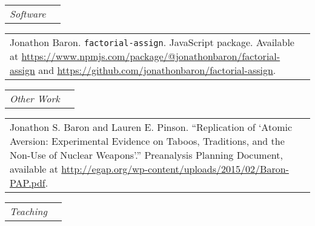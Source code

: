 \documentclass[11pt]{article}
\begin{document}
\vspace{0.13in}

\begin{tabular*}{7.1in}{p{6.925in}p{3cm}}
{\large {\emph{Software}}}
\end{tabular*} 

\vspace{0.13in}

\begin{tabular*}{7.1in}{p{6.925in}p{3cm}}
Jonathon Baron. \verb+factorial-assign+. JavaScript package. Available at \url{https://www.npmjs.com/package/@jonathonbaron/factorial-assign} and \url{https://github.com/jonathonbaron/factorial-assign}.
\end{tabular*}

\vspace{0.13in}

\begin{tabular*}{7.1in}{p{6.925in}p{3cm}}
{\large {\emph{Other Work}}}
\end{tabular*} 
	
\vspace{0.13in}

\begin{tabular*}{7.1in}{p{6.925in}p{3cm}}
Jonathon S. Baron and Lauren E. Pinson. ``Replication of `Atomic Aversion: Experimental Evidence on Taboos, Traditions, and the Non-Use of Nuclear Weapons'.'' Preanalysis Planning Document, available at \url{http://egap.org/wp-content/uploads/2015/02/Baron-PAP.pdf}. 
\end{tabular*}

\vspace{0.13in}

\begin{comment}	
\begin{tabular*}{7.1in}{p{6.925in}p{3cm}}
Jonathon S. Baron. ``Research Note: Predicting North Korean provocations from official state rhetoric.''
\end{tabular*}

\vspace{0.13in}

\begin{tabular*}{7.1in}{p{6.925in}p{3cm}}
Peter M. Aronow, Jonathon Baron, and Jun Won Park. ``Improving Convenience Samples through Shared Questions: Survey Evidence from the `Quasi-ANES'.''
\end{tabular*}

\vspace{0.13in}
\end{comment}
\begin{tabular*}{7.1in}{p{6.925in}p{3cm}}
{\large {\emph{Teaching}}}
\end{tabular*} 
\end{document}
